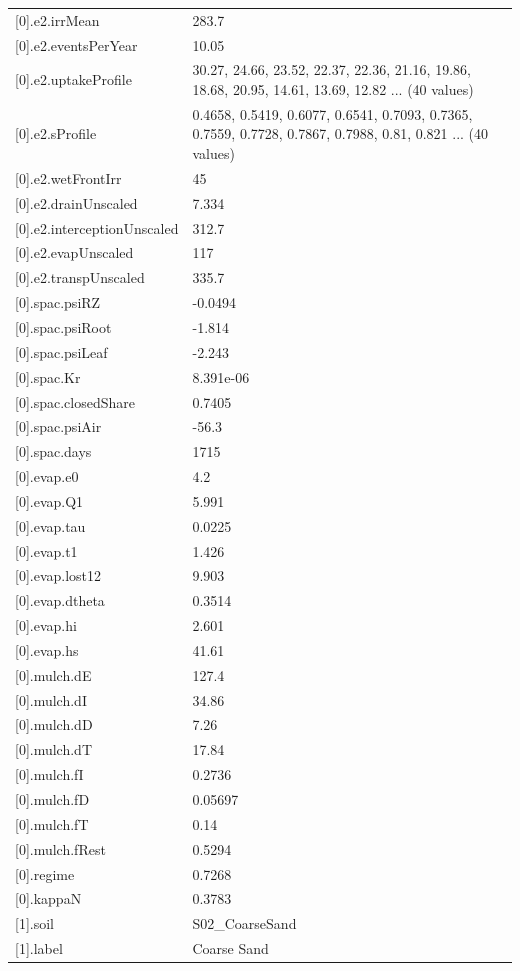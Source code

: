 {\begin{longtable}{p{}p{}}
{}[0].e2.irrMean & 283.7\\
{}[0].e2.eventsPerYear & 10.05\\
{}[0].e2.uptakeProfile & 30.27, 24.66, 23.52, 22.37, 22.36, 21.16, 19.86, 18.68, 20.95, 14.61, 13.69, 12.82 ... (40 values)\\
{}[0].e2.sProfile & 0.4658, 0.5419, 0.6077, 0.6541, 0.7093, 0.7365, 0.7559, 0.7728, 0.7867, 0.7988, 0.81, 0.821 ... (40 values)\\
{}[0].e2.wetFrontIrr & 45\\
{}[0].e2.drainUnscaled & 7.334\\
{}[0].e2.interceptionUnscaled & 312.7\\
{}[0].e2.evapUnscaled & 117\\
{}[0].e2.transpUnscaled & 335.7\\
{}[0].spac.psiRZ & -0.0494\\
{}[0].spac.psiRoot & -1.814\\
{}[0].spac.psiLeaf & -2.243\\
{}[0].spac.Kr & 8.391e-06\\
{}[0].spac.closedShare & 0.7405\\
{}[0].spac.psiAir & -56.3\\
{}[0].spac.days & 1715\\
{}[0].evap.e0 & 4.2\\
{}[0].evap.Q1 & 5.991\\
{}[0].evap.tau & 0.0225\\
{}[0].evap.t1 & 1.426\\
{}[0].evap.lost12 & 9.903\\
{}[0].evap.dtheta & 0.3514\\
{}[0].evap.hi & 2.601\\
{}[0].evap.hs & 41.61\\
{}[0].mulch.dE & 127.4\\
{}[0].mulch.dI & 34.86\\
{}[0].mulch.dD & 7.26\\
{}[0].mulch.dT & 17.84\\
{}[0].mulch.fI & 0.2736\\
{}[0].mulch.fD & 0.05697\\
{}[0].mulch.fT & 0.14\\
{}[0].mulch.fRest & 0.5294\\
{}[0].regime & 0.7268\\
{}[0].kappaN & 0.3783\\
{}[1].soil & S02\_CoarseSand\\
{}[1].label & Coarse Sand\\

\end{longtable}}
